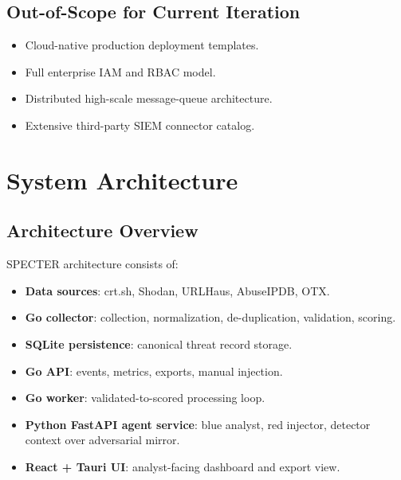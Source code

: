 \documentclass[11pt,a4paper]{article}
\begin{document}
\subsection{Out-of-Scope for Current Iteration}
\begin{itemize}[leftmargin=1.5em]
  \item Cloud-native production deployment templates.
  \item Full enterprise IAM and RBAC model.
  \item Distributed high-scale message-queue architecture.
  \item Extensive third-party SIEM connector catalog.
\end{itemize}

\section{System Architecture}
\subsection{Architecture Overview}
SPECTER architecture consists of:
\begin{itemize}[leftmargin=1.5em]
  \item \textbf{Data sources}: crt.sh, Shodan, URLHaus, AbuseIPDB, OTX.
  \item \textbf{Go collector}: collection, normalization, de-duplication, validation, scoring.
  \item \textbf{SQLite persistence}: canonical threat record storage.
  \item \textbf{Go API}: events, metrics, exports, manual injection.
  \item \textbf{Go worker}: validated-to-scored processing loop.
  \item \textbf{Python FastAPI agent service}: blue analyst, red injector, detector context over adversarial mirror.
  \item \textbf{React + Tauri UI}: analyst-facing dashboard and export view.
\end{itemize}
\end{document}

